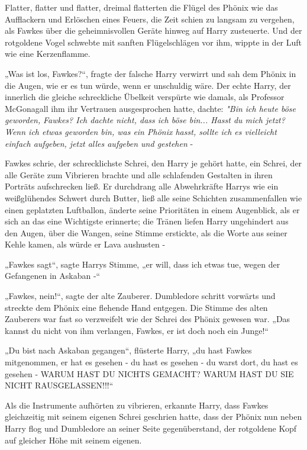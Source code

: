 {Flatter, flatter und flatter, dreimal flatterten die Flügel des Phönix wie das Aufflackern und Erlöschen eines Feuers, die Zeit schien zu langsam zu vergehen, als Fawkes über die geheimnisvollen Geräte hinweg auf Harry zusteuerte. Und der rotgoldene Vogel schwebte mit sanften Flügelschlägen vor ihm, wippte in der Luft wie eine Kerzenflamme.

„Was ist los, Fawkes?“, fragte der falsche Harry verwirrt und sah dem Phönix in die Augen, wie er es tun würde, wenn er unschuldig wäre. Der echte Harry, der innerlich die gleiche schreckliche Übelkeit verspürte wie damals, als Professor McGonagall ihm ihr Vertrauen ausgesprochen hatte, dachte: \emph{"Bin ich heute böse geworden,} \emph{Fawkes? Ich dachte nicht, dass ich böse bin... Hasst du mich jetzt? Wenn ich etwas geworden bin, was ein Phönix hasst, sollte ich es vielleicht einfach aufgeben, jetzt alles aufgeben und gestehen} -

Fawkes schrie, der schrecklichste Schrei, den Harry je gehört hatte, ein Schrei, der alle Geräte zum Vibrieren brachte und alle schlafenden Gestalten in ihren Porträts aufschrecken ließ. Er durchdrang alle Abwehrkräfte Harrys wie ein weißglühendes Schwert durch Butter, ließ alle seine Schichten zusammenfallen wie einen geplatzten Luftballon, änderte seine Prioritäten in einem Augenblick, als er sich an das eine Wichtigste erinnerte; die Tränen liefen Harry ungehindert aus den Augen, über die Wangen, seine Stimme erstickte, als die Worte aus seiner Kehle kamen, als würde er Lava aushusten -

„Fawkes sagt“, sagte Harrys Stimme, „er will, dass ich etwas tue, wegen der Gefangenen in Askaban -“

„Fawkes, nein!“, sagte der alte Zauberer. Dumbledore schritt vorwärts und streckte dem Phönix eine flehende Hand entgegen. Die Stimme des alten Zauberers war fast so verzweifelt wie der Schrei des Phönix gewesen war. „Das kannst du nicht von ihm verlangen, Fawkes, er ist doch noch ein Junge!“

„Du bist nach Askaban gegangen“, flüsterte Harry, „du hast Fawkes mitgenommen, er hat es gesehen - du hast es gesehen - du warst dort, du hast es gesehen - WARUM HAST DU NICHTS GEMACHT? WARUM HAST DU SIE NICHT RAUSGELASSEN!!!“

Als die Instrumente aufhörten zu vibrieren, erkannte Harry, dass Fawkes gleichzeitig mit seinem eigenen Schrei geschrien hatte, dass der Phönix nun neben Harry flog und Dumbledore an seiner Seite gegenüberstand, der rotgoldene Kopf auf gleicher Höhe mit seinem eigenen.

}
